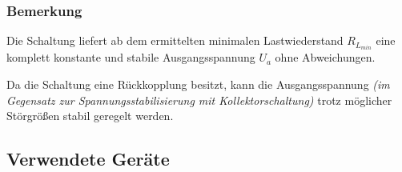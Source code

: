 \documentclass[a4paper]{hitec}
\begin{document}
\subsubsection{Bemerkung}

Die Schaltung liefert ab dem ermittelten minimalen Lastwiederstand $R_{L_{min}}$ eine komplett konstante und stabile Ausgangsspannung $U_{a}$ ohne Abweichungen.

Da die Schaltung eine Rückkopplung besitzt, kann die Ausgangsspannung \textit{(im Gegensatz zur Spannungsstabilisierung mit Kollektorschaltung)} trotz möglicher Störgrößen stabil geregelt werden.

\subsection{Verwendete Geräte}

\begin{devicelist}
\end{devicelist}

\clearpage

\IncludeHistoryTimeline

\clearpage




\end{document}
